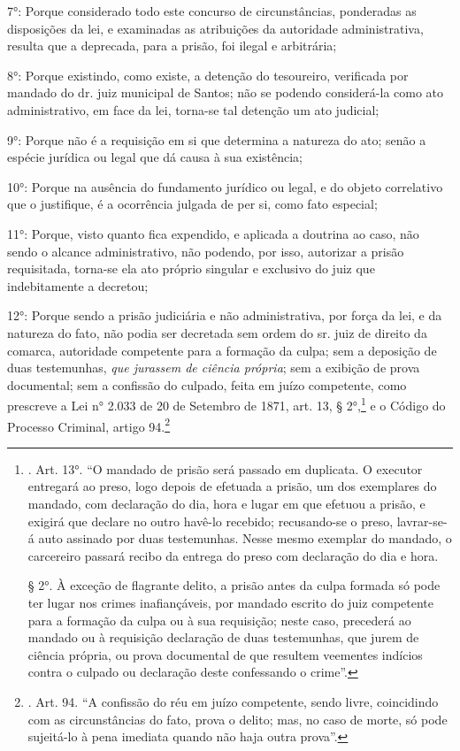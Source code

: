 7°: Porque considerado todo este concurso de circunstâncias, ponderadas
as disposições da lei, e examinadas as atribuições da autoridade
administrativa, resulta que a deprecada, para a prisão, foi ilegal e
arbitrária;

8°: Porque existindo, como existe, a detenção do tesoureiro, verificada
por mandado do dr. juiz municipal de Santos; não se podendo considerá-la
como ato administrativo, em face da lei, torna-se tal detenção um ato
judicial;

9°: Porque não é a requisição em si que determina a natureza do ato;
senão a espécie jurídica ou legal que dá causa à sua existência;

10°: Porque na ausência do fundamento jurídico ou legal, e do objeto
correlativo que o justifique, é a ocorrência julgada de per si, como
fato especial;

11°: Porque, visto quanto fica expendido, e aplicada a doutrina ao caso,
não sendo o alcance administrativo, não podendo, por isso, autorizar a
prisão requisitada, torna-se ela ato próprio singular e exclusivo do
juiz que indebitamente a decretou;

12°: Porque sendo a prisão judiciária e não administrativa, por força da
lei, e da natureza do fato, não podia ser decretada sem ordem do sr.
juiz de direito da comarca, autoridade competente para a formação da
culpa; sem a deposição de duas testemunhas, \emph{que jurassem de
ciência própria}; sem a exibição de prova documental; sem a confissão do
culpado, feita em juízo competente, como prescreve a Lei n° 2.033 de 20
de Setembro de 1871, art. 13, § 2°,\footnote{. Art. 13°. ``O mandado de
  prisão será passado em duplicata. O executor entregará ao preso, logo
  depois de efetuada a prisão, um dos exemplares do mandado, com
  declaração do dia, hora e lugar em que efetuou a prisão, e exigirá que
  declare no outro havê-lo recebido; recusando-se o preso, lavrar-se-á
  auto assinado por duas testemunhas. Nesse mesmo exemplar do mandado, o
  carcereiro passará recibo da entrega do preso com declaração do dia e
  hora.

  § 2°. À exceção de flagrante delito, a prisão antes da culpa formada
  só pode ter lugar nos crimes inafiançáveis, por mandado escrito do
  juiz competente para a formação da culpa ou à sua requisição; neste
  caso, precederá ao mandado ou à requisição declaração de duas
  testemunhas, que jurem de ciência própria, ou prova documental de que
  resultem veementes indícios contra o culpado ou declaração deste
  confessando o crime''.} e o Código do Processo Criminal, artigo
94.\footnote{. Art. 94. ``A confissão do réu em juízo competente, sendo
  livre, coincidindo com as circunstâncias do fato, prova o delito; mas,
  no caso de morte, só pode sujeitá-lo à pena imediata quando não haja
  outra prova''.}

